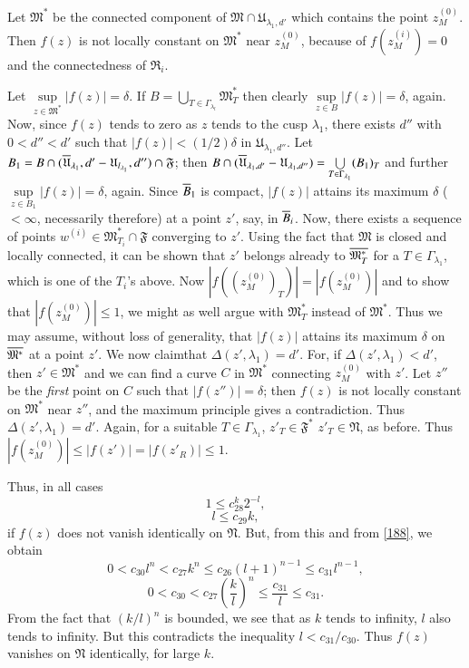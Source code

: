 Let $\mathfrak{M}^{\ast}$ be the connected component of
$\mathfrak{M}\cap \mathfrak{U}_{\lambda_{1},d'}$ which contains the
point $z^{(0)}_{M}$. Then $f(z)$ is not locally constant on
$\mathfrak{M}^{\ast}$ near $z^{(0)}_{M}$, because of
$f(z^{(i)}_{M})=0$ and the connectedness of $\mathfrak{R}_{i}$.

Let $\sup\limits_{z\in\mathfrak{M}^{\ast}}|f(z)|=\delta$. If
$B=\bigcup\limits_{T\in\Gamma_{\lambda_{l}}}\mathfrak{M}^{\ast}_{T}$
  then clearly $\sup\limits_{z\in B}|f(z)|=\delta$, again. Now, since
  $f(z)$ tends to zero as $z$ tends to the cusp $\lambda_{1}$, there
  exists $d''$ with $0<d''<d'$ such that $|f(z)|<(1/2)\delta$ in
  $\mathfrak{U}_{\lambda_{1},d''}$. Let $B_{1}=B\cap
  (\overline{\mathfrak{U}}_{\lambda_{1}},d'-\mathfrak{U}_{l_{\lambda_{1}}},d'')\cap
  \mathfrak{F}$; then $B\cap
  (\overline{\mathfrak{U}}_{\lambda_{1},d'}-\mathfrak{U}_{\lambda_{1},d''})=\bigcup\limits_{T\in\Gamma_{\lambda_{1}}}(B_{1})_{T}$
  and further $\sup\limits_{z\in B_{1}}|f(z)|=\delta$, again. Since
  $\overline{B}_{1}$ is compact, $|f(z)|$ attains its maximum $\delta$
  ($<\infty$, necessarily therefore) at a point $z'$, say, in
  $\overline{B}_{i}$. Now, there exists a sequence of points
  $w^{(i)}\in\mathfrak{M}^{\ast}_{T_{i}}\cap \mathfrak{F}$ converging
  to $z'$. Using the fact that $\mathfrak{M}$ is closed and locally
  connected, it can be shown that $z'$ belongs already to
  $\overline{\mathfrak{M}^{\ast}_{T}}$ for a $T\in\Gamma_{\lambda_{1}}$,
  which is one of the $T_{i}$'s above. Now
  $|f((z^{(0)}_{M})_{T})|=|f(z^{(0)}_{M})|$ and to show that
  $|f(z^{(0)}_{M})|\leq 1$, we might as well argue with
  $\mathfrak{M}^{\ast}_{T}$ instead of $\mathfrak{M}^{\ast}$. Thus we
  may assume, without loss of generality, that $|f(z)|$ attains its
  maximum $\delta$ on $\overline{\mathfrak{M}^{\ast}}$ at a point $z'$. We
  now claim\pageoriginale that $\Delta(z',\lambda_{1})=d'$. For, if
  $\Delta(z',\lambda_{1})<d'$, then $z'\in\mathfrak{M}^{\ast}$ and we
  can find a curve $C$ in $\mathfrak{M}^{\ast}$ connecting
  $z^{(0)}_{M}$ with $z'$. Let $z''$ be the {\em first} point on $C$
  such that $|f(z'')|=\delta$; then $f(z)$ is not locally constant on
  $\mathfrak{M}^{\ast}$ near $z''$, and the maximum principle gives a
  contradiction. Thus $\Delta(z',\lambda_{1})=d'$. Again, for a
  suitable $T\in\Gamma_{\lambda_{1}}$, $z'_{T}\in\mathfrak{F}^{\ast}$
  \ie $z'_{T}\in\mathfrak{N}$, as before. Thus $|f(z^{(0)}_{M})|\leq
  |f(z')|=|f(z'_{R})|\leq 1$.

Thus, in all cases
$$
1\leq c^{k}_{28}2^{-l},
$$
\ie
$$
l\leq c_{29}k,
$$
if $f(z)$ does not vanish identically on $\mathfrak{N}$. But, from
this and from \eqref{188}, we obtain
$$
0<c_{30}l^{n}<c_{27}k^{n}\leq c_{26}(l+1)^{n-1}\leq c_{31}l^{n-1},
$$
\ie
$$
0<c_{30}<c_{27}\left(\frac{k}{l}\right)^{n}\leq \frac{c_{31}}{l}\leq
c_{31}.
$$
From the fact that $(k/l)^{n}$ is bounded, we see that as $k$ tends to
infinity, $l$ also tends to infinity. But this contradicts the
inequality $l<c_{31}/c_{30}$. Thus $f(z)$ vanishes on $\mathfrak{N}$
identically, for large $k$.

